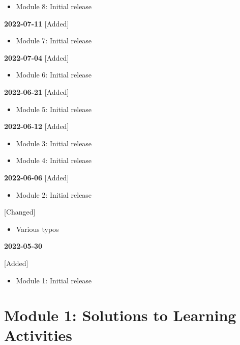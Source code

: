 \documentclass[
]{memoir}
\providecommand{\tightlist}{%
  \setlength{\itemsep}{0pt}\setlength{\parskip}{0pt}}
\begin{document}
\begin{itemize}
\tightlist
\item
  Module 8: Initial release
\end{itemize}

\textbf{2022-07-11}
{[}Added{]}

\begin{itemize}
\tightlist
\item
  Module 7: Initial release
\end{itemize}

\textbf{2022-07-04}
{[}Added{]}

\begin{itemize}
\tightlist
\item
  Module 6: Initial release
\end{itemize}

\textbf{2022-06-21}
{[}Added{]}

\begin{itemize}
\tightlist
\item
  Module 5: Initial release
\end{itemize}

\textbf{2022-06-12}
{[}Added{]}

\begin{itemize}
\tightlist
\item
  Module 3: Initial release
\item
  Module 4: Initial release
\end{itemize}

\textbf{2022-06-06}
{[}Added{]}

\begin{itemize}
\tightlist
\item
  Module 2: Initial release
\end{itemize}

{[}Changed{]}

\begin{itemize}
\tightlist
\item
  Various typos
\end{itemize}

\textbf{2022-05-30}

{[}Added{]}

\begin{itemize}
\tightlist
\item
  Module 1: Initial release
\end{itemize}

\hypertarget{module-1-solutions-to-learning-activities}{%
\chapter*{Module 1: Solutions to Learning Activities}\label{module-1-solutions-to-learning-activities}}
\end{document}

